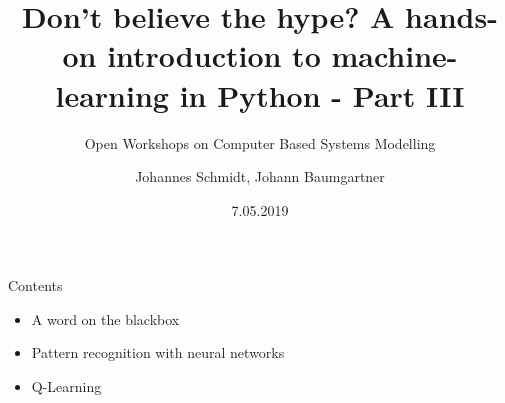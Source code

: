 \documentclass[color=usenames,dvipsnames]{beamer}
\title[Workshop - Machine Learning]{ Don't believe the hype? A hands-on introduction to machine-learning in Python - Part III}
\subtitle{Open Workshops on Computer Based Systems Modelling}
\author{Johannes Schmidt, Johann Baumgartner}
\institute{Institute for Sustainable Economic Development, BOKU, Vienna}
\date{7.05.2019}
\begin{document}
{


\begin{frame}

\maketitle



\end{frame}
}

\begin{frame}{Contents}
\begin{itemize}
	\item A word on the blackbox
	\item Pattern recognition with neural networks
	\item Q-Learning

\end{itemize}
\end{frame}

\end{document}
